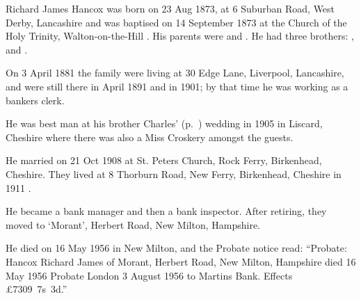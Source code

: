 
Richard James Hancox was born on 23 Aug 1873, at 6 Suburban Road, West Derby, Lancashire \cite{RJHancoxBirth} and was baptised on 14 September 1873 at the Church of the Holy Trinity, Walton-on-the-Hill \cite{RJHancoxBaptism}.  His parents were  and  . He had three brothers:
,  and .

On 3 April 1881 the family were living at 30 Edge Lane, Liverpool, Lancashire, \cite{RJHancoxResidence1} and were still there in April 1891 \cite{RJHancoxResidence2} and in 1901; by that time he was working as a bankers clerk.\cite{RJHancoxOccupation}

He was best man\cite{PeterKarpinski_2016-04-04} at his brother Charles' (p.~\pageref{Charles_Edward_Hancox}) wedding in 1905 in Liscard, Cheshire \cite{CEHancoxMarriage} where there was also a Miss Croskery amongst the guests.\cite{PeterKarpinski_2016-04-04}

He married  on 21 Oct 1908 at St. Peters Church, Rock Ferry, Birkenhead, Cheshire.\cite{RJHancoxMarriage} They lived at 8 Thorburn Road, New Ferry, Birkenhead, Cheshire in 1911 \cite{RJHancoxResidence3}.

He became a bank manager and then a bank inspector.  After retiring, they moved to `Morant', Herbert Road, New Milton, Hampshire.\cite{RJHancoxResidence4}

He died on 16 May 1956 in New Milton,  and the Probate notice read:
``Probate: Hancox Richard James of Morant, Herbert Road, New Milton, Hampshire died 16 May 1956 Probate London 3 August 1956 to Martins Bank. Effects \pounds7309~7s~3d.''\cite{RJHancoxDeath}
